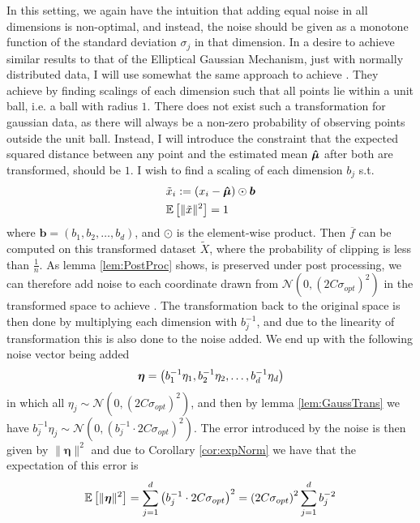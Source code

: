 \documentclass[a4paper,12pt]{article}
\begin{document}
In this setting, we again have the intuition that adding equal noise in all dimensions is non-optimal, and instead, the noise should be given as a monotone function
of the standard deviation $\sigma_j$ in that dimension. In a desire to achieve similar results to that of the Elliptical Gaussian Mechanism, just with normally distributed data,
I will use somewhat the same approach to achieve \edp.
They achieve \edp by finding scalings of each dimension such that all points lie within a unit ball, i.e. a ball with radius $1$. 
There does not exist such a transformation for gaussian data, as there will always be a non-zero 
probability of observing points outside the unit ball.
Instead, I will introduce the constraint that the expected squared distance between any point and the estimated mean $\bm{\hat{\mu}}$ after both are transformed, should be $1$. 
I wish to find a scaling of each dimension $b_j$ s.t.
\begin{align}
\nonumber
    &\tilde{x}_i := (x_i - \bm{\hat{\mu}}) \odot \bm{b} \\
\label{eq:Alg3Con}
    &\mathbb{E} \left [ \| \tilde{x} \|^2 \right] = 1
\end{align}
where $\bm{b} = (b_1, b_2, \dots, b_d)$, and $\odot$ is the element-wise product. 
Then $\overline{f}$ can be computed on this transformed dataset $\tilde{X}$, where the probability of clipping is less than $\frac{1}{n}$.
As lemma \ref{lem:PostProc} shows, \edp is preserved under post processing, 
we can therefore add noise to each coordinate drawn from $\mathcal{N}(0,(2C\sigma_{opt})^2)$ in the transformed space to achieve \edp.
The transformation back to the original space is then done by multiplying each dimension with $b_j^{-1}$, and due to the linearity of transformation 
this is also done to the noise added.
We end up with the following noise vector being added
\[
    \bm{\eta} = \left ( b_1^{-1}\eta_1, b_2^{-1}\eta_2, \dots, b_d^{-1}\eta_d \right)
\]
in which all $\eta_j \sim \mathcal{N}(0,(2C\sigma_{opt})^2)$, and then by lemma \ref{lem:GaussTrans} we have $b_j^{-1}\eta_j \sim \mathcal{N}(0, (b_j^{-1} \cdot 2C\sigma_{opt})^2)$.
The error introduced by the noise is then given by $\| \bm{\eta} \|^2$ and due to Corollary \ref{cor:expNorm} we have that the expectation of this error is 
\begin{equation}
\label{eq:Alg3Err}
    \mathbb{E} \left [ \| \bm{\eta} \|^2 \right] = \sum_{j=1}^d \left (b_j^{-1} \cdot 2C\sigma_{opt}\right)^2   = \left (2C\sigma_{opt}\right)^2 \sum_{j=1}^d b_j^{-2}
\end{equation}
\end{document}
